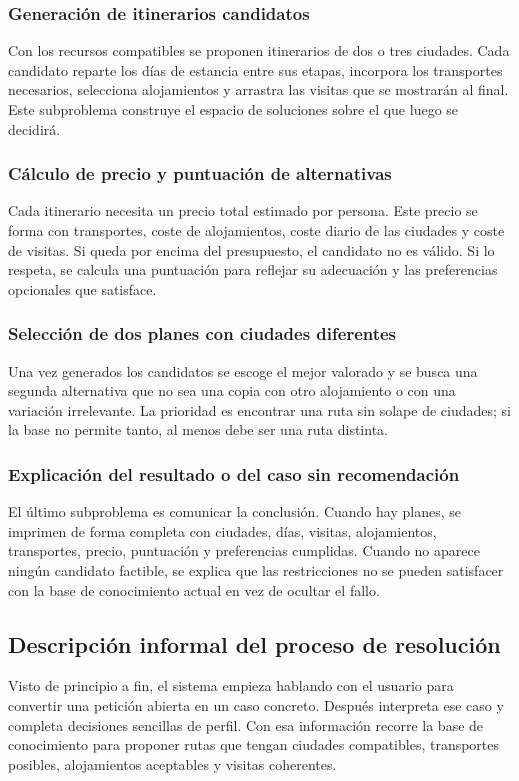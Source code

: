 \documentclass[11pt,a4paper]{article}
\begin{document}
\subsubsection{Generaci\'on de itinerarios candidatos}
Con los recursos compatibles se proponen itinerarios de dos o tres ciudades.
Cada candidato reparte los d\'ias de estancia entre sus etapas, incorpora los
transportes necesarios, selecciona alojamientos y arrastra las visitas que se
mostrar\'an al final. Este subproblema construye el espacio de soluciones sobre
el que luego se decidir\'a.

\subsubsection{C\'alculo de precio y puntuaci\'on de alternativas}
Cada itinerario necesita un precio total estimado por persona. Este precio se
forma con transportes, coste de alojamientos, coste diario de las ciudades y
coste de visitas. Si queda por encima del presupuesto, el candidato no es
v\'alido. Si lo respeta, se calcula una puntuaci\'on para reflejar su adecuaci\'on
y las preferencias opcionales que satisface.

\subsubsection{Selecci\'on de dos planes con ciudades diferentes}
Una vez generados los candidatos se escoge el mejor valorado y se busca una
segunda alternativa que no sea una copia con otro alojamiento o con una
variaci\'on irrelevante. La prioridad es encontrar una ruta sin solape de
ciudades; si la base no permite tanto, al menos debe ser una ruta distinta.

\subsubsection{Explicaci\'on del resultado o del caso sin recomendaci\'on}
El \'ultimo subproblema es comunicar la conclusi\'on. Cuando hay planes, se
imprimen de forma completa con ciudades, d\'ias, visitas, alojamientos,
transportes, precio, puntuaci\'on y preferencias cumplidas. Cuando no aparece
ning\'un candidato factible, se explica que las restricciones no se pueden
satisfacer con la base de conocimiento actual en vez de ocultar el fallo.

\subsection{Descripci\'on informal del proceso de resoluci\'on}
Visto de principio a fin, el sistema empieza hablando con el usuario para
convertir una petici\'on abierta en un caso concreto. Despu\'es interpreta ese
caso y completa decisiones sencillas de perfil. Con esa informaci\'on recorre la
base de conocimiento para proponer rutas que tengan ciudades compatibles,
transportes posibles, alojamientos aceptables y visitas coherentes.
\end{document}
